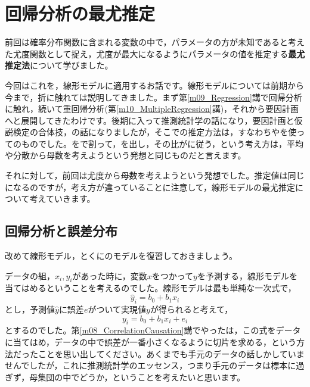 \documentclass{ltjbook}
\begin{document}
\chapter{回帰分析の最尤推定}
\label{m24_maximum_likelihood}
前回は確率分布関数に含まれる変数の中で，パラメータの方が未知であると考えた尤度関数として捉え，尤度が最大になるようにパラメータの値を推定する\textbf{最尤推定法}について学びました。

今回はこれを，線形モデルに適用するお話です。線形モデルについては前期から今まで，折に触れては説明してきました。まず第\ref{m09_Regression}講で回帰分析に触れ，続いて重回帰分析(第\ref{m10_MultipleRegression}講)，それから要因計画へと展開してきたわけです。後期に入って推測統計学の話になり，要因計画と仮説検定の合体技，の話になりましたが，そこでの推定方法は，すなわちやを使ってのものでした。をで割って，を出し，その比がに従う，という考え方は，平均や分散から母数を考えようという発想と同じものだと言えます。

それに対して，前回は尤度から母数を考えようという発想でした。推定値は同じになるのですが，考え方が違っていることに注意して，線形モデルの最尤推定について考えていきます。

\section{回帰分析と誤差分布}
改めて線形モデル，とくにのモデルを復習しておきましょう。

データの組，$x_i,y_i$があった時に，変数$x$をつかって$y$を予測する，線形モデルを当てはめるということを考えるのでした。線形モデルは最も単純な一次式で，
\[\hat{y}_i = b_0 + b_1 x_i \]
とし，予測値$\hat{y}$に誤差$e$がついて実現値$y$が得られると考えて，
\[ y_i= b_0 + b_1 x_i + e_i  \]
とするのでした。第\ref{m08_CorrelationCausation}講でやったは，この式をデータに当てはめ，データの中で誤差が一番小さくなるように切片を求める，という方法だったことを思い出してください。あくまでも手元のデータの話しかしていませんでしたが，これに推測統計学のエッセンス，つまり手元のデータは標本に過ぎず，母集団の中でどうか，ということを考えたいと思います。
\end{document}
